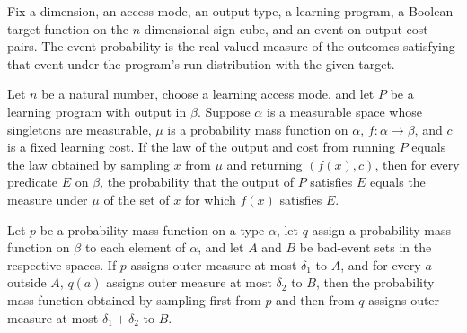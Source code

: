 \begin{definition}
\label{FABL.LearningProgram.eventProbability}
\leanok
{}
Fix a dimension, an access mode, an output type, a learning program, a Boolean target
function on the $n$-dimensional sign cube, and an event on output-cost pairs. The event
probability is the real-valued measure of the outcomes satisfying that event under the
program's run distribution with the given target.
\end{definition}

\begin{theorem}
\label{FABL.LearningProgram.eventProbability_eq_toMeasure_real_of_runWithCost_eq_map}
\leanok
{}
Let $n$ be a natural number, choose a learning access mode, and let $P$ be a learning
program with output in $\beta$. Suppose $\alpha$ is a measurable space whose singletons
are measurable, $\mu$ is a probability mass function on $\alpha$, $f:\alpha\to\beta$,
and $c$ is a fixed learning cost. If the law of the output and cost from running $P$
equals the law obtained by sampling $x$ from $\mu$ and returning $(f(x),c)$, then for
every predicate $E$ on $\beta$, the probability that the output of $P$ satisfies $E$
equals the measure under $\mu$ of the set of $x$ for which $f(x)$ satisfies $E$.
\end{theorem}

\begin{theorem}
\label{FABL.PMF.toOuterMeasure_bind_le_add}
\leanok
{}
Let $p$ be a probability mass function on a type $\alpha$, let $q$ assign a probability
mass function on $\beta$ to each element of $\alpha$, and let $A$ and $B$ be bad-event
sets in the respective spaces. If $p$ assigns outer measure at most $\delta_1$ to $A$,
and for every $a$ outside $A$, $q(a)$ assigns outer measure at most $\delta_2$ to $B$,
then the probability mass function obtained by sampling first from $p$ and then from $q$
assigns outer measure at most $\delta_1+\delta_2$ to $B$.
\end{theorem}

